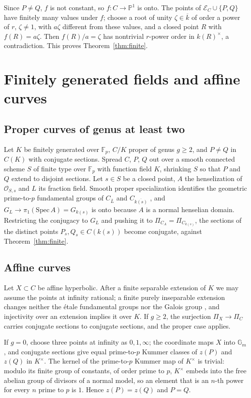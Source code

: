 \documentclass[11pt]{amsart}
\theoremstyle{remark}
\newcommand{\F}{\mathbb F}
\begin{document}
Since $P\ne Q$, $f$ is not constant, so $f\colon C\to\mathbb P^1$ is onto. The points of $\mathcal E_C\cup\{P,Q\}$ have finitely many values under $f$; choose a root of unity $\zeta\in\overline k$ of order a power of $r$, $\zeta\ne1$, with $a\zeta$ different from these values, and a closed point $R$ with $f(R)=a\zeta$. Then $f(R)/a=\zeta$ has nontrivial $r$-power order in $k(R)^\times$, a contradiction. This proves Theorem~\ref{thm:finite}.

\section{Finitely generated fields and affine curves}\label{sec:open}

\subsection{Proper curves of genus at least two}
Let $K$ be finitely generated over $\F_p$, $C/K$ proper of genus $g\ge2$, and $P\ne Q$ in $C(K)$ with conjugate sections. Spread $C$, $P$, $Q$ out over a smooth connected scheme $S$ of finite type over $\F_p$ with function field $K$, shrinking $S$ so that $P$ and $Q$ extend to disjoint sections. Let $s\in S$ be a closed point, $A$ the henselization of $\mathcal O_{S,s}$ and $L$ its fraction field. Smooth proper specialization identifies the geometric prime-to-$p$ fundamental groups of $C_{\overline L}$ and $C_{\overline{k(s)}}$ \cite[X, Th\'eor\`eme 3.8, Corollaire 3.9]{SGA1}, and $G_L\to\pi_1(\mathrm{Spec}\,A)=G_{k(s)}$ is onto because $A$ is a normal henselian domain. Restricting the conjugacy to $G_L$ and pushing it to $\Pi_{C_A}=\Pi_{C_{k(s)}}$, the sections of the distinct points $P_s,Q_s\in C(k(s))$ become conjugate, against Theorem~\ref{thm:finite}.

\subsection{Affine curves}
Let $X\subset C$ be affine hyperbolic. After a finite separable extension of $K$ we may assume the points at infinity rational; a finite purely inseparable extension changes neither the \'etale fundamental groups nor the Galois group \cite[IX, Th\'eor\`eme 4.10]{SGA1}, and injectivity over an extension implies it over $K$. If $g\ge2$, the surjection $\Pi_X\to\Pi_C$ carries conjugate sections to conjugate sections, and the proper case applies.

If $g=0$, choose three points at infinity as $0,1,\infty$; the coordinate maps $X$ into $\mathbb G_m$, and conjugate sections give equal prime-to-$p$ Kummer classes of $z(P)$ and $z(Q)$ in $K^\times$. The kernel of the prime-to-$p$ Kummer map of $K^\times$ is trivial: modulo its finite group of constants, of order prime to $p$, $K^\times$ embeds into the free abelian group of divisors of a normal model, so an element that is an $n$-th power for every $n$ prime to $p$ is $1$. Hence $z(P)=z(Q)$ and $P=Q$.
\end{document}
